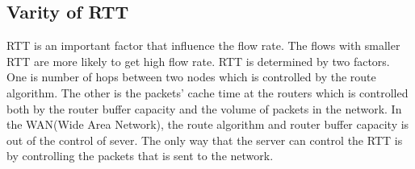 

\subsection{Varity of RTT}
\label{sub:RTT}

RTT is an important factor that influence the flow rate. The flows with smaller RTT are more likely to get high flow rate. RTT is determined by two factors. One is number of hops between two nodes which is controlled by the route algorithm. The other is the packets' cache time at the routers which is controlled both by the router buffer capacity and the volume of packets in the network. In the WAN(Wide Area Network), the route algorithm and router buffer capacity is out of the control of sever. The only way that the server can control the RTT is by controlling the packets that is sent to the network.

